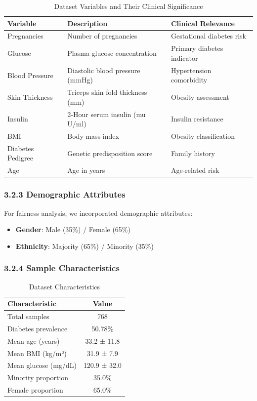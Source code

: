 \documentclass[12pt,a4paper]{article}
\begin{document}
\begin{table}[H]
\centering
\caption{Dataset Variables and Their Clinical Significance}
\begin{tabular}{lll}
\toprule
\textbf{Variable} & \textbf{Description} & \textbf{Clinical Relevance} \\
\midrule
Pregnancies & Number of pregnancies & Gestational diabetes risk \\
Glucose & Plasma glucose concentration & Primary diabetes indicator \\
Blood Pressure & Diastolic blood pressure (mmHg) & Hypertension comorbidity \\
Skin Thickness & Triceps skin fold thickness (mm) & Obesity assessment \\
Insulin & 2-Hour serum insulin (mu U/ml) & Insulin resistance \\
BMI & Body mass index & Obesity classification \\
Diabetes Pedigree & Genetic predisposition score & Family history \\
Age & Age in years & Age-related risk \\
\bottomrule
\end{tabular}
\label{tab:variables}
\end{table}

\subsubsection{3.2.3 Demographic Attributes}

For fairness analysis, we incorporated demographic attributes:
\begin{itemize}
    \item \textbf{Gender}: Male (35\%) / Female (65\%)
    \item \textbf{Ethnicity}: Majority (65\%) / Minority (35\%)
\end{itemize}

\subsubsection{3.2.4 Sample Characteristics}

\begin{table}[H]
\centering
\caption{Dataset Characteristics}
\begin{tabular}{lc}
\toprule
\textbf{Characteristic} & \textbf{Value} \\
\midrule
Total samples & 768 \\
Diabetes prevalence & 50.78\% \\
Mean age (years) & 33.2 ± 11.8 \\
Mean BMI (kg/m²) & 31.9 ± 7.9 \\
Mean glucose (mg/dL) & 120.9 ± 32.0 \\
Minority proportion & 35.0\% \\
Female proportion & 65.0\% \\
\bottomrule
\end{tabular}
\label{tab:sample_characteristics}
\end{table}
\end{document}
